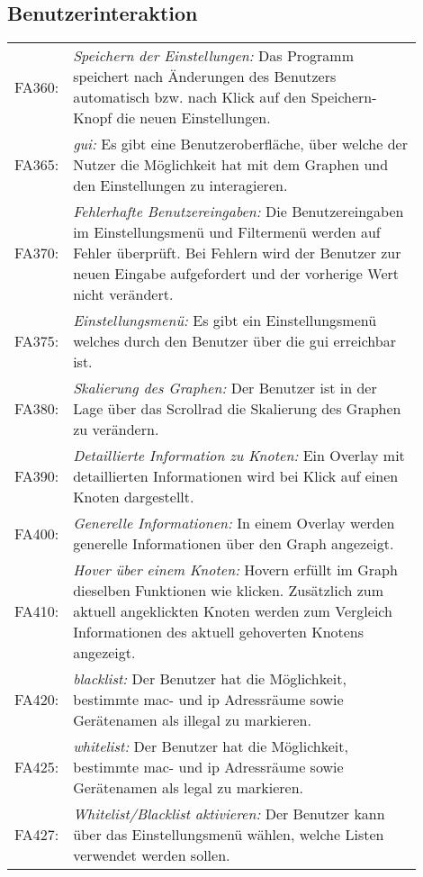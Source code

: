 \subsection{Benutzerinteraktion}

\begin{tabular}{lp{0.9\linewidth}}

FA360: & \textit{Speichern der Einstellungen: }Das Programm speichert nach Änderungen des Benutzers automatisch bzw. nach Klick auf den Speichern-Knopf die neuen Einstellungen. \\

FA365: & \textit{\gls{gui}: }Es gibt eine Benutzeroberfläche, über welche der Nutzer die Möglichkeit hat mit dem Graphen und den Einstellungen zu interagieren. \\

FA370: & \textit{Fehlerhafte Benutzereingaben: }Die Benutzereingaben im Einstellungsmenü und Filtermenü werden auf Fehler überprüft. Bei Fehlern wird der Benutzer zur neuen Eingabe aufgefordert und der vorherige Wert nicht verändert. \\

FA375: & \textit{Einstellungsmenü: }Es gibt ein Einstellungsmenü welches durch den Benutzer über die \gls{gui} erreichbar ist. \\

FA380: & \textit{Skalierung des Graphen: }Der Benutzer ist in der Lage über das Scrollrad die Skalierung des Graphen zu verändern. \\

FA390: & \textit{Detaillierte Information zu Knoten: }Ein Overlay mit detaillierten Informationen wird bei Klick auf einen Knoten dargestellt. \\

FA400: & \textit{Generelle Informationen: }In einem Overlay werden generelle Informationen über den Graph angezeigt. \\

FA410: & \textit{Hover über einem Knoten: }Hovern erfüllt im Graph dieselben Funktionen wie klicken. Zusätzlich zum aktuell angeklickten Knoten werden zum Vergleich Informationen des aktuell gehoverten Knotens angezeigt. \\

FA420: & \textit{\gls{blacklist}: }Der Benutzer hat die Möglichkeit, bestimmte \gls{mac}- und \gls{ip} Adressräume sowie Gerätenamen als illegal zu markieren. \\

FA425: & \textit{\gls{whitelist}: }Der Benutzer hat die Möglichkeit, bestimmte \gls{mac}- und \gls{ip} Adressräume sowie Gerätenamen als legal zu markieren. \\

FA427: & \textit{Whitelist/Blacklist aktivieren: }Der Benutzer kann über das Einstellungsmenü wählen, welche Listen verwendet werden sollen. \\

\end{tabular}

